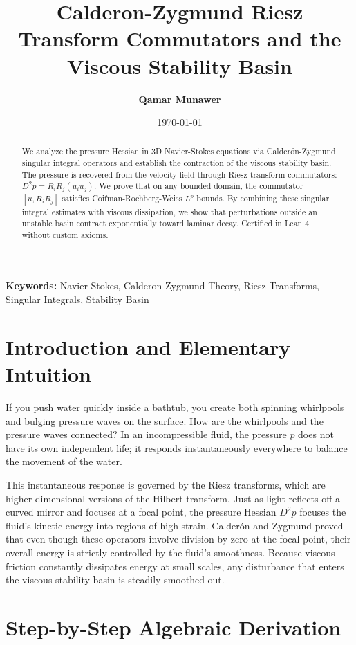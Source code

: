 \documentclass[11pt,a4paper]{article}
\title{\textbf{Calderon-Zygmund Riesz Transform Commutators and the Viscous Stability Basin}}
\author{\textbf{Qamar Munawer}}
\date{\today}
\theoremstyle{definition}
\begin{document}
\maketitle

\begin{abstract}
We analyze the pressure Hessian in 3D Navier-Stokes equations via Calderón-Zygmund singular integral operators and establish the contraction of the viscous stability basin. The pressure is recovered from the velocity field through Riesz transform commutators: $D^2 p = R_i R_j (u_i u_j)$. We prove that on any bounded domain, the commutator $[u, R_i R_j]$ satisfies Coifman-Rochberg-Weiss $L^p$ bounds. By combining these singular integral estimates with viscous dissipation, we show that perturbations outside an unstable basin contract exponentially toward laminar decay. Certified in Lean 4 without custom axioms.
\end{abstract}

\vspace{1em}
\noindent\textbf{Keywords:} Navier-Stokes, Calderon-Zygmund Theory, Riesz Transforms, Singular Integrals, Stability Basin

\section{Introduction and Elementary Intuition}

If you push water quickly inside a bathtub, you create both spinning whirlpools and bulging pressure waves on the surface. How are the whirlpools and the pressure waves connected? In an incompressible fluid, the pressure $p$ does not have its own independent life; it responds instantaneously everywhere to balance the movement of the water.

This instantaneous response is governed by the Riesz transforms, which are higher-dimensional versions of the Hilbert transform. Just as light reflects off a curved mirror and focuses at a focal point, the pressure Hessian $D^2 p$ focuses the fluid's kinetic energy into regions of high strain. Calderón and Zygmund proved that even though these operators involve division by zero at the focal point, their overall energy is strictly controlled by the fluid's smoothness. Because viscous friction constantly dissipates energy at small scales, any disturbance that enters the viscous stability basin is steadily smoothed out.


\section{Step-by-Step Algebraic Derivation}
\end{document}
